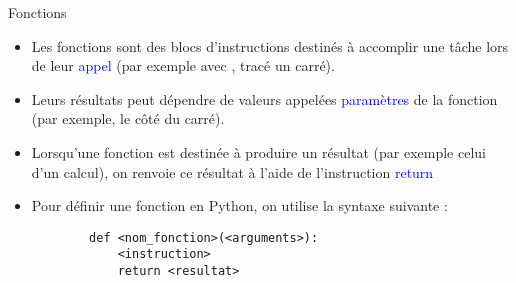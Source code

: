 \documentclass[10pt]{beamer}
\begin{document}
\begin{frame}[fragile]
	\mframe{\Python}
	\begin{alertblock}{Fonctions}
		\begin{itemize}
			\item<2->{Les fonctions sont des blocs d'instructions destinés à accomplir une tâche lors de leur \textcolor{blue}{appel} (par exemple avec , tracé un carré).}
			\item<3->{Leurs résultats peut dépendre de valeurs appelées \textcolor{blue}{paramètres} de la fonction (par exemple, le côté du carré).}
			\item<4->{Lorsqu'une fonction est destinée à produire un résultat (par exemple celui d'un calcul), on renvoie ce résultat à l'aide de l'instruction \textcolor{blue}{return}}
			\item<5->{Pour définir une fonction en Python, on utilise la syntaxe suivante :
		\begin{lstlisting}
		def <nom_fonction>(<arguments>):
			<instruction>
			return <resultat>
		\end{lstlisting}}
		\end{itemize}
	\end{alertblock}
\end{frame}
\end{document}
